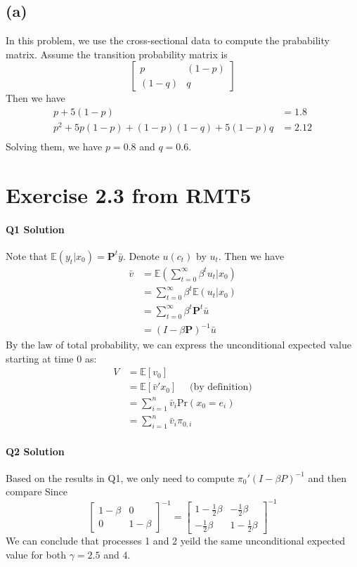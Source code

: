 \documentclass[11pt]{article}
\theoremstyle{definition}
\theoremstyle{boldtitle} %
\numberwithin{equation}{section}
\numberwithin{figure}{section}
\numberwithin{table}{section}
\begin{document}
\subsection*{(a)} In this problem, we use the cross-sectional data to compute the prabability matrix.
Assume the transition probability matrix is 
\[
\left[
\begin{matrix}
  p&  (1-p) \\ (1-q) &  q 
\end{matrix}
\right]
\]
Then we have 
\begin{align*}
    p + 5(1-p) & = 1.8 \\
    p^2 + 5 p(1-p) + (1-p)(1-q) + 5(1-p)q & = 2.12 \\
\end{align*}
Solving them, we have $p = 0.8$ and $q = 0.6$.

\section*{Exercise 2.3 from RMT5}
\paragraph{Q1 Solution}
Note that $\mathbb{E}(y_t|x_0) = \mathbf{P}^t \bar{y}$.
Denote $u(c_t)$ by $u_t$.
Then we have 
\begin{align*}
    \bar{v} & = \mathbb{E}(\sum_{t=0}^{\infty}\beta^t u_t |x_0) \\ 
        & = \sum_{t=0}^{\infty}\beta^t  \mathbb{E}(u_t |x_0) \\ 
        & = \sum_{t=0}^{\infty}\beta^t  \mathbf{P}^t \bar{u} \\ 
        & = (I - \beta  \mathbf{P})^{-1} \bar{u}
\end{align*}
By the law of total probability, we can express the unconditional expected value starting at time 0 as:
\begin{align*}
    V & = \mathbb{E}[v_0] \\ 
     & = \mathbb{E}[\bar{v}' x_0] \quad \text{ (by definition)}\\
     & = \sum_{i=1}^{n} \bar{v}_i \text{Pr}(x_0 = e_i) \\
     & = \sum_{i=1}^{n} \bar{v}_i \pi_{0,i} 
\end{align*}

\paragraph{Q2 Solution}
Based on the results in Q1, we only need to compute $\pi_0' (I - \beta P)^{-1}$ and then compare
Since 
\[
\left[
\begin{matrix}
  1-\beta & 0 \\ 0 &  1 - \beta
\end{matrix}
\right]^{-1} 
= 
\left[
\begin{matrix}
  1-\frac{1}{2}\beta & -\frac{1}{2}\beta \\ -\frac{1}{2}\beta &  1 -\frac{1}{2}\beta
\end{matrix}
\right]^{-1} 
\]
We can conclude that processes 1 and 2 yeild the same unconditional expected value for both 
$\gamma = 2.5$ and $4$.
\end{document}
